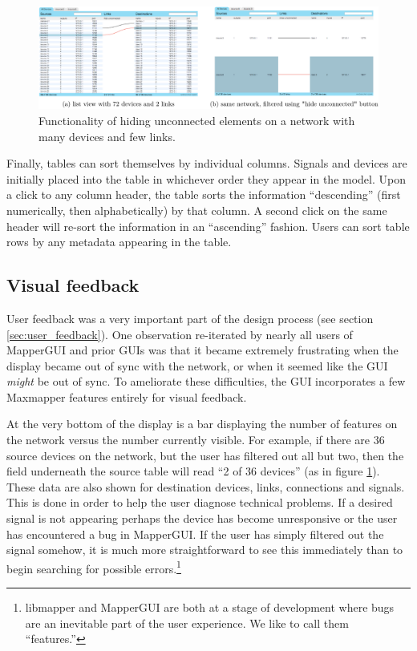 \begin{figure}
	\centering
	\includegraphics[width=1\textwidth]{figures/hide_unconnected}
\caption{Functionality of hiding unconnected elements on a network with many devices and few links.}
\label{fig:hide_unconnected}
\end{figure}

Finally, tables can sort themselves by individual columns. Signals and devices are initially placed into the table in whichever order they appear in the model. Upon a click to any column header, the table sorts the information ``descending'' (first numerically, then alphabetically) by that column. A second click on the same header will re-sort the information in an ``ascending'' fashion. Users can sort table rows by any metadata appearing in the table.


	\subsection{Visual feedback} %
	\label{sub:visual_feedback}

User feedback was a very important part of the design process (see section \ref{sec:user_feedback}). One observation re-iterated by nearly all users of MapperGUI and prior GUIs was that it became extremely frustrating when the display became out of sync with the network, or when it seemed like the GUI \emph{might} be out of sync. To ameliorate these difficulties, the GUI incorporates a few Maxmapper features entirely for visual feedback.
		
At the very bottom of the display is a bar displaying the number of features on the network versus the number currently visible. For example, if there are 36 source devices on the network, but the user has filtered out all but two, then the field underneath the source table will read ``2 of 36 devices'' (as in figure \ref{fig:hide_unconnected}). These data are also shown for destination devices, links, connections and signals. This is done in order to help the user diagnose technical problems. If a desired signal is not appearing perhaps the device has become unresponsive or the user has encountered a bug in MapperGUI. If the user has simply filtered out the signal somehow, it is much more straightforward to see this immediately than to begin searching for possible errors.\footnote{libmapper and MapperGUI are both at a stage of development where bugs are an inevitable part of the user experience. We like to call them ``features.''}

